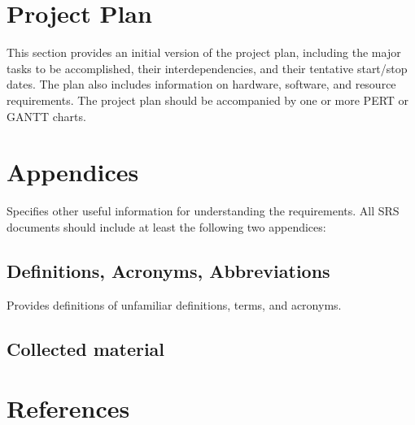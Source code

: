 \documentclass[]{article}
\begin{document}
\section{Project Plan}
This section provides an initial version of the project plan, including the major tasks to be accomplished, their interdependencies, and their tentative start/stop dates. The plan also includes information on hardware, software, and  resource requirements. 
The project plan should be accompanied by one or more PERT or GANTT charts. 

\section{Appendices}
Specifies other useful information for understanding the requirements. All SRS documents should include at least the following two appendices: 

\subsection{Definitions, Acronyms, Abbreviations}
Provides definitions of unfamiliar definitions, terms, and acronyms. 

\subsection{Collected material}

\section {References}




\end{document}
